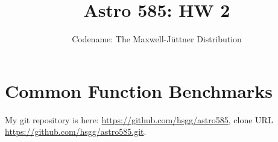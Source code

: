 \documentclass[11pt]{article}
\title{Astro 585: HW 2}
\author{Codename: The Maxwell-Jüttner Distribution}
\begin{document}
\maketitle

\section{Common Function Benchmarks}
My git repository is here: \url{https://github.com/hsgg/astro585}, clone URL
\url{https://github.com/hsgg/astro585.git}.
\end{document}
